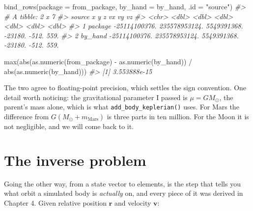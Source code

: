 \documentclass[
  10.5pt,
  letterpaper,
]{scrbook}
\newenvironment{Shaded}{\begin{snugshade}}{\end{snugshade}}
\newcommand{\AttributeTok}[1]{\textcolor[rgb]{0.00,0.00,0.00}{#1}}
\newcommand{\CommentTok}[1]{\textcolor[rgb]{0.00,0.00,0.00}{\textit{#1}}}
\newcommand{\FunctionTok}[1]{\textcolor[rgb]{0.00,0.00,0.00}{#1}}
\newcommand{\NormalTok}[1]{\textcolor[rgb]{0.00,0.00,0.00}{#1}}
\newcommand{\SpecialCharTok}[1]{\textcolor[rgb]{0.00,0.00,0.00}{#1}}
\newcommand{\StringTok}[1]{\textcolor[rgb]{0.00,0.00,0.00}{#1}}
\theoremstyle{plain}
\theoremstyle{remark}
\begin{document}
\begin{Shaded}
\begin{Highlighting}[]
\FunctionTok{bind\_rows}\NormalTok{(}\AttributeTok{package =}\NormalTok{ from\_package, }\AttributeTok{by\_hand =}\NormalTok{ by\_hand, }\AttributeTok{.id =} \StringTok{"source"}\NormalTok{)}
\CommentTok{\#\textgreater{} \# A tibble: 2 x 7}
\CommentTok{\#\textgreater{}   source              x             y           z      vx    vy    vz}
\CommentTok{\#\textgreater{}   \textless{}chr\textgreater{}           \textless{}dbl\textgreater{}         \textless{}dbl\textgreater{}       \textless{}dbl\textgreater{}   \textless{}dbl\textgreater{} \textless{}dbl\textgreater{} \textless{}dbl\textgreater{}}
\CommentTok{\#\textgreater{} 1 package {-}25114100376. 235578953124. 5549391368. {-}23180. {-}512.  559.}
\CommentTok{\#\textgreater{} 2 by\_hand {-}25114100376. 235578953124. 5549391368. {-}23180. {-}512.  559.}
\end{Highlighting}
\end{Shaded}

\begin{Shaded}
\begin{Highlighting}[]
\FunctionTok{max}\NormalTok{(}\FunctionTok{abs}\NormalTok{(}\FunctionTok{as.numeric}\NormalTok{(from\_package) }\SpecialCharTok{{-}} \FunctionTok{as.numeric}\NormalTok{(by\_hand)) }\SpecialCharTok{/}
      \FunctionTok{abs}\NormalTok{(}\FunctionTok{as.numeric}\NormalTok{(by\_hand)))}
\CommentTok{\#\textgreater{} [1] 3.553888e{-}15}
\end{Highlighting}
\end{Shaded}

The two agree to floating-point precision, which settles the sign
convention. One detail worth noticing: the gravitational parameter I
passed is \(\mu = GM_{\odot}\), the parent's mass alone, which is what
\texttt{add\_body\_keplerian()} uses. For Mars the difference from
\(G(M_\odot + m_{\mathrm{Mars}})\) is three parts in ten million. For
the Moon it is not negligible, and we will come back to it.

\section{The inverse problem}\label{the-inverse-problem}

Going the other way, from a state vector to elements, is the step that
tells you what orbit a simulated body is \emph{actually} on, and every
piece of it was derived in Chapter 4. Given relative position
\(\mathbf{r}\) and velocity \(\mathbf{v}\):
\end{document}
